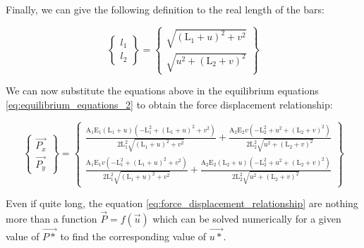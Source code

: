 Finally, we can give the following definition to the real length of the bars:

\begin{equation}
    \begin{Bmatrix}
        l_1 \\
        l_2
    \end{Bmatrix}
    =
    \begin{Bmatrix}
        \sqrt{(\text{L}_1+u)^2+v^2} \\
        \sqrt{u^2+(\text{L}_2+v)^2}
    \end{Bmatrix}
\end{equation}

We can now substitute the equations above in the equilibrium equations \ref{eq:equilibrium_equations_2} to obtain the force displacement relationship:

\begin{equation}
    \begin{Bmatrix}
        \vec{P_x} \\
        \vec{P_y}
    \end{Bmatrix}
    =
    \begin{Bmatrix}
        \frac{\text{A}_1 \text{E}_1 (\text{L}_1+u) \left(-\text{L}_1^2+(\text{L}_1+u)^2+v^2\right)}{2 \text{L}_1^2 \sqrt{(\text{L}_1+u)^2+v^2}} + \frac{\text{A}_2 \text{E}_2 v \left(-\text{L}_2^2+u^2+(\text{L}_2+v)^2\right)}{2 \text{L}_2^2 \sqrt{u^2+(\text{L}_2+v)^2}} \\
        \frac{\text{A}_1 \text{E}_1 v \left(-\text{L}_1^2+(\text{L}_1+u)^2+v^2\right)}{2 \text{L}_1^2 \sqrt{(\text{L}_1+u)^2+v^2}} + \frac{\text{A}_2 \text{E}_2 (\text{L}_2+u) \left(-\text{L}_2^2+u^2+(\text{L}_2+v)^2\right)}{2 \text{L}_2^2 \sqrt{u^2+(\text{L}_2+v)^2}}
    \end{Bmatrix}
    \label{eq:force_displacement_relationship}
\end{equation}

Even if quite long, the equation \ref{eq:force_displacement_relationship} are nothing more than a function ${\vec{P}} = f({\vec{u}})$ which can be solved numerically for a given value of ${\vec{P*}}$ to find the corresponding value of ${\vec{u*}}$.
